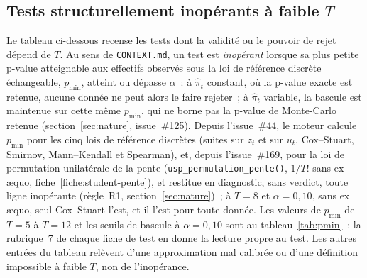 \documentclass[a4paper,11pt]{article}
\newcommand{\code}[1]{\texttt{\small #1}}
\begin{document}
\subsection*{Tests structurellement inopérants à faible $T$}

Le tableau ci-dessous recense les tests dont la validité ou le pouvoir de rejet dépend de $T$.
Au sens de \code{CONTEXT.md}, un test est \emph{inopérant} lorsque sa plus petite p-value atteignable aux effectifs observés sous la loi de référence discrète échangeable, $p_{\min}$, atteint ou dépasse $\alpha$~: à $\hat\pi_t$ constant, où la p-value exacte est retenue, aucune donnée ne peut alors le faire rejeter~; à $\hat\pi_t$ variable, la bascule est maintenue sur cette même $p_{\min}$, qui ne borne pas la p-value de Monte-Carlo retenue (section~\ref{sec:nature}, issue~\#125). Depuis l'issue~\#44, le moteur calcule $p_{\min}$ pour les cinq lois
de référence discrètes (suites sur $z_t$ et sur $u_t$, Cox--Stuart, Smirnov, Mann--Kendall et
Spearman), et, depuis l'issue~\#169, pour la loi de permutation unilatérale de la pente
(\code{usp\_permutation\_pente()}, $1/T!$ sans ex \ae quo, fiche~\ref{fiche:student-pente}), et
restitue en diagnostic, sans verdict, toute ligne inopérante (règle~R1,
section~\ref{sec:nature})~; à $T = 8$ et $\alpha = 0{,}10$, sans ex \ae quo, seul Cox--Stuart
l'est, et il l'est pour toute donnée. Les valeurs de $p_{\min}$ de $T = 5$ à $T = 12$ et les seuils
de bascule à $\alpha = 0{,}10$ sont au tableau~\ref{tab:pmin}~; la rubrique~7 de chaque fiche de
test en donne la lecture propre au test. Les autres entrées du tableau relèvent d'une approximation mal calibrée ou d'une
définition impossible à faible $T$, non de l'inopérance.
\end{document}

